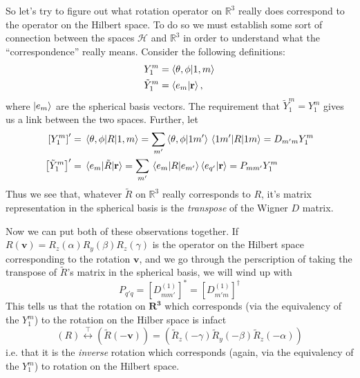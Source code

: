 \documentclass[12pt]{article}
\begin{document}
So let's try to figure out what rotation operator on $\mathbb{R}^3$ really does correspond to the operator on the Hilbert space. To do so we must establish some sort of connection between the spaces $\mathcal{H}$ and $\mathbb{R}^3$ in order to understand what the ``correspondence'' really means. Consider the following definitions:
\begin{align*}
    Y_1^m &= \braket{\theta, \phi}{1, m} \\
    \tilde{Y}_1^m &= \braket{e_m}{\mathbf{r}},
\end{align*}
where $\ket{e_m}$ are the spherical basis vectors. The requirement that $\tilde{Y}_1^m = Y_1^m$ gives us a link between the two spaces. Further, let
\begin{align*}
    \left[Y_1^m\right]' &= \mel{\theta, \phi}{R}{1, m} = \sum_{m'}\braket{\theta, \phi}{1 m'}\mel{1 m'}{R}{1 m} = D_{m'm}Y_1^m \\
    \left[\tilde{Y}_1^m\right]' &= \mel{e_m}{\tilde{R}}{\mathbf{r}} = \sum_{m'} \mel{e_m}{R}{e_{m'}}\braket{e_{q'}}{\mathbf{r}} = P_{mm'}Y_1^m
\end{align*}
Thus we see that, whatever $\tilde{R}$ on $\mathbb{R}^3$ really corresponds to $R$, it's matrix representation in the spherical basis is the \textit{transpose} of the Wigner $D$ matrix. 

Now we can put both of these observations together. If $R(\mathbf{v}) = R_z(\alpha)R_y(\beta)R_z(\gamma)$ is the operator on the Hilbert space corresponding to the rotation $\mathbf{v}$, and we go through the perscription of taking the transpose of $\tilde{R}$'s matrix in the spherical basis, we will wind up with
\[ P_{q'q} = \left[D_{mm'}^{(1)}\right]^* = \left[D_{m'm}^{(1)}\right]^\dag \]
This tells us that the rotation on $\mathbf{R^3}$ which corresponds (via the equivalency of the $Y_1^m$) to the rotation on the Hilber space is infact
\[ (R) \overset{\intercal}{\leftrightarrow} (\tilde{R}(-\mathbf{v})) = (\tilde{R}_z(-\gamma)\tilde{R}_y(-\beta)\tilde{R}_z(-\alpha)) \]
i.e. that it is the \textit{inverse} rotation which corresponds (again, via the equivalency of the $Y_1^m$) to rotation on the Hilbert space.
\end{document}
